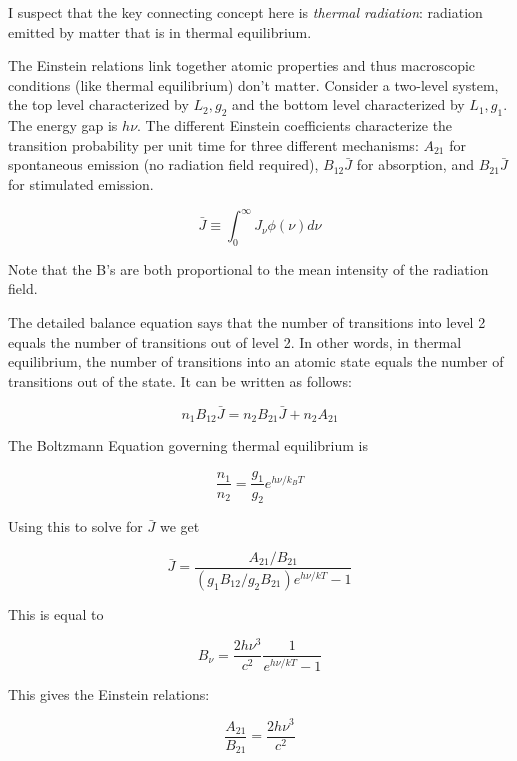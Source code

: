 \documentclass[12pt, letterpaper, preprint]{aastex}
\begin{document}
\begin{enumerate}
I suspect that the key connecting concept here is \emph{thermal radiation}:
radiation emitted by matter that is in thermal equilibrium.

The Einstein relations link together atomic properties and
thus macroscopic conditions (like thermal equilibrium) don't matter.
Consider a two-level system, the top level characterized by
$L_2, g_2$ and the bottom level characterized by $L_1, g_1$. 
The energy gap is $h\nu$. The different Einstein coefficients
characterize the transition probability per unit time for
three different mechanisms: $A_{21}$ for spontaneous emission
(no radiation field required), $B_{12} \bar{J}$ for absorption,
and $B_{21} \bar{J}$ for stimulated emission.

\begin{equation}
  \bar{J} \equiv \int_0^\infty J_\nu \phi(\nu) d\nu
  \label{jbar}
\end{equation}

Note that the B's are both proportional to the mean intensity
of the radiation field.

The detailed balance equation says that the number of transitions into level 2
equals the number of transitions out of level 2. In other words,
in thermal equilibrium, the number of transitions into an atomic state
equals the number of transitions out of the state. 
It can be written as follows:

\begin{equation}
  n_1 B_{12} \bar{J} = n_2 B_{21} \bar{J} + n_2 A_{21}
  \label{detailed-balance}
\end{equation}

The Boltzmann Equation governing thermal equilibrium is

\begin{equation}
  \frac{n_1}{n_2} = \frac{g_1}{g_2} e^{h \nu / k_B T}
  \label{boltzmann-eq}
\end{equation}

Using this to solve for $\bar{J}$ we get

$$ \bar{J} = \frac{A_{21} / B_{21}}{(g_1 B_{12}/g_2 B_{21}) e^{h\nu/kT} - 1} $$

This is equal to 

$$ B_\nu = \frac{2 h \nu^3}{c^2} \frac{1}{e^{h\nu/kT}-1} $$

This gives the Einstein relations:

\begin{equation}
  \frac{A_{21}}{B_{21}} = \frac{2 h \nu^3}{c^2}
  \label{einstein-A}
\end{equation}


\end{enumerate}
\end{document}

